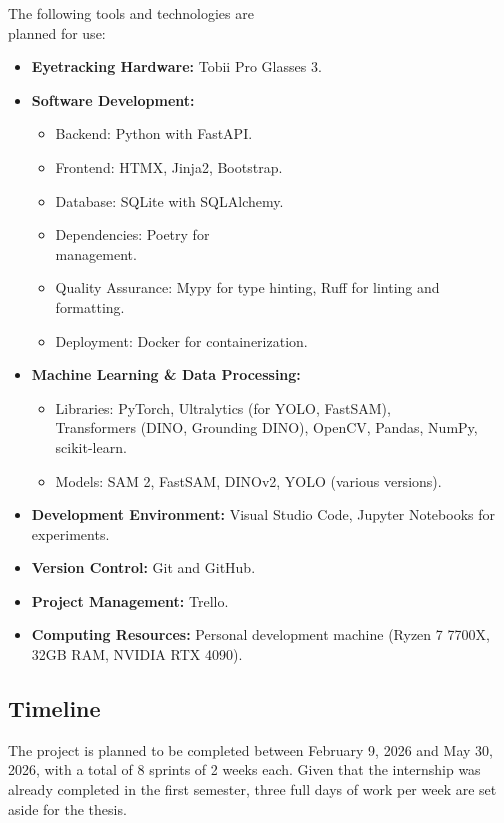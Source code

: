 \documentclass[english]{hogent-article}
\begin{document}
The following tools and technologies are\\ planned for use:
\begin{itemize}
    \item \textbf{Eyetracking Hardware:} Tobii Pro Glasses 3.
    \item \textbf{Software Development:}
        \begin{itemize}
            \item Backend: Python with FastAPI.
            \item Frontend: HTMX, Jinja2, Bootstrap.
            \item Database: SQLite with SQLAlchemy.
            \item Dependencies: Poetry for\\ management.
            \item Quality Assurance: Mypy for type hinting, Ruff for linting and formatting.
            \item Deployment: Docker for containerization.
        \end{itemize}
    \item \textbf{Machine Learning \& Data Processing:}
        \begin{itemize}
            \item Libraries: PyTorch, Ultralytics (for YOLO, FastSAM),\\ Transformers (DINO, Grounding DINO), OpenCV, Pandas, NumPy, scikit-learn.
            \item Models: SAM 2, FastSAM, DINOv2, YOLO (various versions).
        \end{itemize}
    \item \textbf{Development Environment:} Visual Studio Code, Jupyter Notebooks for experiments.
    \item \textbf{Version Control:} Git and GitHub.
    \item \textbf{Project Management:} Trello.
    \item \textbf{Computing Resources:} Personal development machine (Ryzen 7 7700X, 32GB RAM, NVIDIA RTX 4090).
\end{itemize}

\subsection{Timeline}

The project is planned to be completed between February 9, 2026 and May 30, 2026, with a total of 8 sprints of 2 weeks each.
Given that the internship was already completed in the first semester, three full days of work per week are set aside for the thesis.
\end{document}
